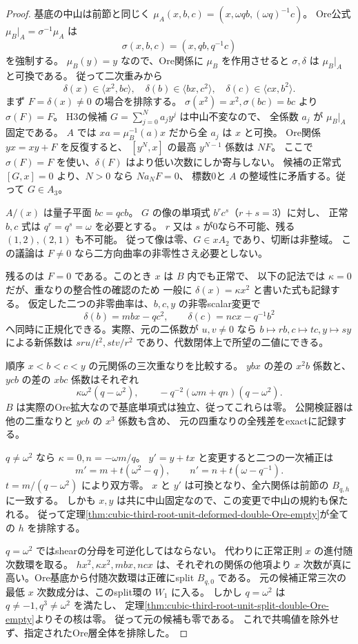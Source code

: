 \begin{proof}
基底の中山は前節と同じく
$\mu_A(x,b,c)=(x,\omega q b,(\omega q)^{-1}c)$。
Ore公式 $\mu_B|_A=\sigma^{-1}\mu_A$ は
\[
 \sigma(x,b,c)=(x,qb,q^{-1}c)
\]
を強制する。
$\mu_B(y)=y$ なので、Ore関係に $\mu_B$ を作用させると
$\sigma,\delta$ は $\mu_B|_A$ と可換である。
従って二次重みから
\[
 \delta(x)\in\langle x^2,bc\rangle,\quad
 \delta(b)\in\langle bx,c^2\rangle,\quad
 \delta(c)\in\langle cx,b^2\rangle.
\]
まず $F=\delta(x)\ne0$ の場合を排除する。
$\sigma(x^2)=x^2,\sigma(bc)=bc$ より $\sigma(F)=F$。
H3の候補 $G=\sum_{j=0}^N a_jy^j$ は中山不変なので、
全係数 $a_j$ が $\mu_B|_A$ 固定である。
$A$ では $xa=\mu_B^{-1}(a)x$ だから全 $a_j$ は $x$ と可換。
Ore関係 $yx=xy+F$ を反復すると、
$[y^N,x]$ の最高 $y^{N-1}$ 係数は $N F$。
ここで $\sigma(F)=F$ を使い、$\delta(F)$ はより低い次数にしか寄与しない。
候補の正常式 $[G,x]=0$ より、$N>0$ なら $N a_NF=0$、
標数0と $A$ の整域性に矛盾する。従って $G\in A_3$。

$A/(x)$ は量子平面 $bc=qcb$。
$G$ の像の単項式 $b^rc^s$（$r+s=3$）に対し、
正常 $b,c$ 式は $q^r=q^s=\omega$ を必要とする。
$r$ 又は $s$ が0なら不可能、残る $(1,2),(2,1)$ も不可能。
従って像は零、$G\in xA_2$ であり、切断は非整域。
この議論は $F\ne0$ なら二方向曲率の非零性さえ必要としない。

残るのは $F=0$ である。このとき $x$ は $B$ 内でも正常で、
以下の記法では $\kappa=0$ だが、重なりの整合性の確認のため
一般に $\delta(x)=\kappa x^2$ と書いた式も記録する。
仮定した二つの非零曲率は、$b,c,y$ の非零scalar変更で
\[
 \delta(b)=m bx-qc^2,\qquad
 \delta(c)=n cx-q^{-1}b^2
\]
へ同時に正規化できる。実際、元の二係数が $u,v\ne0$ なら
$b\mapsto r b,c\mapsto t c,y\mapsto s y$ による新係数は
$sr u/t^2,st v/r^2$ であり、代数閉体上で所望の二値にできる。

順序 $x<b<c<y$ の元関係の三次重なりを比較する。
$ybx$ の差の $x^2b$ 係数と、$ycb$ の差の $xbc$ 係数はそれぞれ
\[
 \kappa\omega^2(q-\omega^2),\qquad
 -q^{-2}(\omega m+qn)(q-\omega^2).
\]
$B$ は実際のOre拡大なので基底単項式は独立、従ってこれらは零。
公開検証器は他の二重なりと $ycb$ の $x^3$ 係数も含め、
元の四重なりの全残差をexactに記録する。

$q\ne\omega^2$ なら
$\kappa=0,n=-\omega m/q$。
$y'=y+t x$ と変更すると二つの一次補正は
\[
 m'=m+t(\omega^2-q),\qquad
 n'=n+t(\omega-q^{-1}).
\]
$t=m/(q-\omega^2)$ により双方零。
$x$ と $y'$ は可換となり、全六関係は前節の $B_{q,h}$ に一致する。
しかも $x,y$ は共に中山固定なので、この変更で中山の規約も保たれる。
従って定理\ref{thm:cubic-third-root-unit-deformed-double-Ore-empty}が全ての $h$ を排除する。

$q=\omega^2$ ではshearの分母を可逆化してはならない。
代わりに正常正則 $x$ の進付随次数環を取る。
$h x^2,\kappa x^2,m bx,n cx$ は、それぞれの関係の他項より
$x$ 次数が真に高い。Ore基底から付随次数環は正確にsplit $B_{q,0}$ である。
元の候補正常三次の最低 $x$ 次数成分は、このsplit環の $W_1$ に入る。
しかし $q=\omega^2$ は $q\ne-1,q^3\ne\omega^2$ を満たし、
定理\ref{thm:cubic-third-root-unit-split-double-Ore-empty}よりその核は零。
従って元の候補も零である。
これで共鳴値を除外せず、指定されたOre層全体を排除した。
\end{proof}
